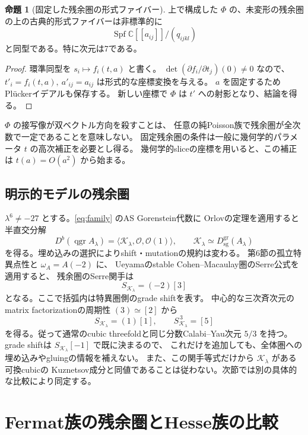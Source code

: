 \documentclass[a4paper,11pt]{ltjsarticle}
\theoremstyle{definition}
\newtheorem{theorem}{命題}[section]
\newcommand{\CC}{\mathbb C}
\newcommand{\OO}{\mathcal O}
\newcommand{\Spf}{\operatorname{Spf}}
\newcommand{\qgr}{\operatorname{qgr}}
\newcommand{\Dsg}{D_{\mathrm{sg}}}
\begin{document}
\begin{theorem}[固定した残余圏の形式ファイバー]\label{thm:fibre}
上で構成した $\Phi$ の、未変形の残余圏の上の古典的形式ファイバーは非標準的に
\[
 \Spf\CC[[a_{ij}]]/(q_{ijkl})
\]
と同型である。特に次元は7である。
\end{theorem}

\begin{proof}
環準同型を $s_i\mapsto f_i(t,a)$ と書く。
$\det(\partial f_i/\partial t_j)(0)\ne0$ なので、
$t'_i=f_i(t,a),\ a'_{ij}=a_{ij}$ は形式的な座標変換を与える。
$a$ を固定するためPlückerイデアルも保存する。
新しい座標で $\Phi$ は $t'$ への射影となり、結論を得る。
\end{proof}

$\Phi$ の接写像が双ベクトル方向を殺すことは、
任意の純Poisson族で残余圏が全次数で一定であることを意味しない。
固定残余圏の条件は一般に幾何学的パラメータ $t$ の高次補正を必要とし得る。
幾何学的sliceの座標を用いると、この補正は $t(a)=O(a^2)$ から始まる。

\subsection{明示的モデルの残余圏}

$\lambda^6\ne-27$ とする。\eqref{eq:family} のAS Gorenstein代数に
Orlovの定理\cite[Theorem 2.5]{Orlov}を適用すると半直交分解
\[
 D^b(\qgr A_\lambda)
 =\langle\mathcal K_\lambda,\OO,\OO(1)\rangle,\qquad
 \mathcal K_\lambda\simeq\Dsg^{\mathrm{gr}}(A_\lambda)
\]
を得る。埋め込みの選択によりshift・mutationの規約は変わる。
第6節の孤立特異点性と $\omega_A=A(-2)$ に、
Ueyamaのstable Cohen--Macaulay圏のSerre公式\cite{Ueyama}を適用すると、
残余圏のSerre関手は
\[
 S_{\mathcal K_\lambda}=(-2)[3]
\]
となる。ここで括弧内は特異圏側のgrade shiftを表す。
中心的な三次斉次元のmatrix factorizationの周期性 $(3)\simeq[2]$ から
\[
 S_{\mathcal K_\lambda}=(1)[1],\qquad
 \boxed{S_{\mathcal K_\lambda}^{\,3}=[5]}
\]
を得る。従って通常のcubic threefoldと同じ分数Calabi--Yau次元 $5/3$ を持つ。
grade shiftは $S_{\mathcal K_\lambda}[-1]$ で既に決まるので、
これだけを追加しても、全体圏への埋め込みやgluingの情報を補えない。
また、この関手等式だけから $\mathcal K_\lambda$ がある可換cubicの
Kuznetsov成分と同値であることは従わない。次節では別の具体的な比較により同定する。

\section{Fermat族の残余圏とHesse族の比較}
\end{document}
